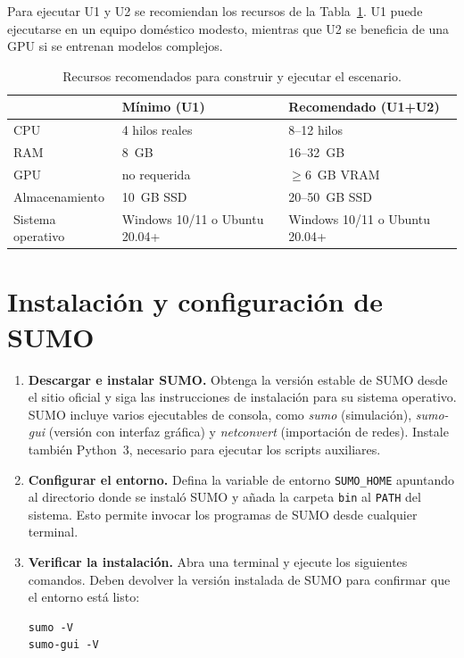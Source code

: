 Para ejecutar U1 y U2 se recomiendan los recursos de la
Tabla~\ref{tab:hw}.  U1 puede ejecutarse en un equipo doméstico
modesto, mientras que U2 se beneficia de una GPU si se entrenan
modelos complejos.

\begin{table}[H]
\centering
\begin{tabular}{p{4cm}p{5.5cm}p{5.5cm}}
\hline
 & \textbf{Mínimo (U1)} & \textbf{Recomendado (U1+U2)} \\
\hline
CPU & 4 hilos reales & 8--12 hilos \\
RAM & 8~GB & 16--32~GB \\
GPU & no requerida & $\geq$6~GB VRAM \\
Almacenamiento & 10~GB SSD & 20--50~GB SSD \\
Sistema operativo & Windows 10/11 o Ubuntu 20.04+ & Windows 10/11 o Ubuntu 20.04+ \\
\hline
\end{tabular}
\caption{Recursos recomendados para construir y ejecutar el escenario.}
\label{tab:hw}
\end{table}

\section{Instalación y configuración de SUMO}

\begin{enumerate}
  \item \textbf{Descargar e instalar SUMO.} Obtenga la versión estable
    de SUMO desde el sitio oficial y siga las instrucciones de
    instalación para su sistema operativo.  SUMO incluye varios
    ejecutables de consola, como \emph{sumo} (simulación),
    \emph{sumo-gui} (versión con interfaz gráfica) y
    \emph{netconvert} (importación de redes).
    Instale también Python~3, necesario para ejecutar los
    scripts auxiliares.

  \item \textbf{Configurar el entorno.} Defina la variable de
    entorno \verb|SUMO_HOME| apuntando al directorio donde se instaló
    SUMO y añada la carpeta \verb|bin| al \verb|PATH| del sistema.
    Esto permite invocar los programas de SUMO desde cualquier
    terminal.

  \item \textbf{Verificar la instalación.} Abra una terminal y ejecute
    los siguientes comandos.  Deben devolver la versión instalada de
    SUMO para confirmar que el entorno está listo:

    \begin{verbatim}
sumo -V
sumo-gui -V
    \end{verbatim}
\end{enumerate}

